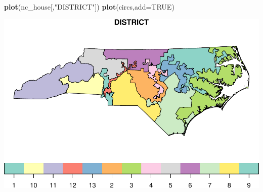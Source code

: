 \documentclass[11pt,ignorenonframetext,]{beamer}
\newenvironment{Shaded}{}{}
\newcommand{\DataTypeTok}[1]{\textcolor[rgb]{0.56,0.13,0.00}{#1}}
\newcommand{\KeywordTok}[1]{\textcolor[rgb]{0.00,0.44,0.13}{\textbf{#1}}}
\newcommand{\NormalTok}[1]{#1}
\newcommand{\OtherTok}[1]{\textcolor[rgb]{0.00,0.44,0.13}{#1}}
\newcommand{\StringTok}[1]{\textcolor[rgb]{0.25,0.44,0.63}{#1}}
\let\oldShaded\Shaded
\let\endoldShaded\endShaded
\renewenvironment{Shaded}{\footnotesize\begin{spacing}{0.9}\oldShaded}{\endoldShaded\end{spacing}}
\begin{document}
\begin{frame}[fragile]{}
\protect\hypertarget{section-5}{}

\begin{Shaded}
\begin{Highlighting}[]
\KeywordTok{plot}\NormalTok{(nc_house[,}\StringTok{"DISTRICT"}\NormalTok{])}
\KeywordTok{plot}\NormalTok{(circs,}\DataTypeTok{add=}\OtherTok{TRUE}\NormalTok{)}
\end{Highlighting}
\end{Shaded}

\begin{center}\includegraphics[width=\textwidth]{Lec16_files/figure-beamer/unnamed-chunk-37-1} \end{center}

\end{frame}
\end{document}
